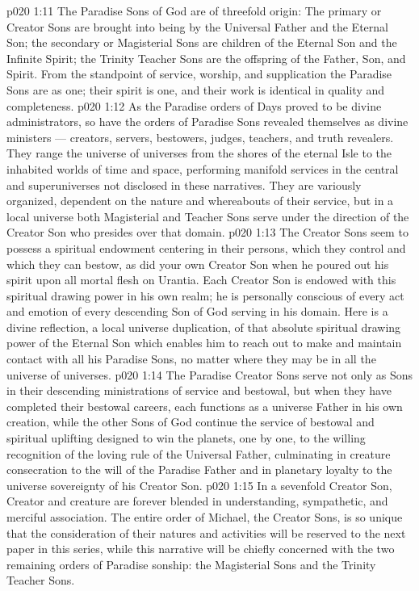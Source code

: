 \vs p020 1:11 \pc The Paradise Sons of God are of threefold origin: The primary or Creator Sons are brought into being by the Universal Father and the Eternal Son; the secondary or Magisterial Sons are children of the Eternal Son and the Infinite Spirit; the Trinity Teacher Sons are the offspring of the Father, Son, and Spirit. From the standpoint of service, worship, and supplication the Paradise Sons are as one; their spirit is one, and their work is identical in quality and completeness.
\vs p020 1:12 As the Paradise orders of Days proved to be divine administrators, so have the orders of Paradise Sons revealed themselves as divine ministers --- creators, servers, bestowers, judges, teachers, and truth revealers. They range the universe of universes from the shores of the eternal Isle to the inhabited worlds of time and space, performing manifold services in the central and superuniverses not disclosed in these narratives. They are variously organized, dependent on the nature and whereabouts of their service, but in a local universe both Magisterial and Teacher Sons serve under the direction of the Creator Son who presides over that domain.
\vs p020 1:13 The Creator Sons seem to possess a spiritual endowment centering in their persons, which they control and which they can bestow, as did your own Creator Son when he poured out his spirit upon all mortal flesh on Urantia. Each Creator Son is endowed with this spiritual drawing power in his own realm; he is personally conscious of every act and emotion of every descending Son of God serving in his domain. Here is a divine reflection, a local universe duplication, of that absolute spiritual drawing power of the Eternal Son which enables him to reach out to make and maintain contact with all his Paradise Sons, no matter where they may be in all the universe of universes.
\vs p020 1:14 The Paradise Creator Sons serve not only as Sons in their descending ministrations of service and bestowal, but when they have completed their bestowal careers, each functions as a universe Father in his own creation, while the other Sons of God continue the service of bestowal and spiritual uplifting designed to win the planets, one by one, to the willing recognition of the loving rule of the Universal Father, culminating in creature consecration to the will of the Paradise Father and in planetary loyalty to the universe sovereignty of his Creator Son.
\vs p020 1:15 In a sevenfold Creator Son, Creator and creature are forever blended in understanding, sympathetic, and merciful association. The entire order of Michael, the Creator Sons, is so unique that the consideration of their natures and activities will be reserved to the next paper in this series, while this narrative will be chiefly concerned with the two remaining orders of Paradise sonship: the Magisterial Sons and the Trinity Teacher Sons.
